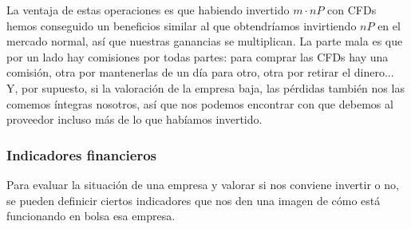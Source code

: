 \documentclass[nochap,palatino,shortheader]{apuntes}
\begin{document}
La ventaja de estas operaciones es que habiendo invertido $m·nP$ con CFDs hemos conseguido un beneficios similar al que obtendríamos invirtiendo $nP$ en el mercado normal, así que nuestras ganancias se multiplican. La parte mala es que por un lado hay comisiones por todas partes: para comprar las CFDs hay una comisión, otra por mantenerlas de un día para otro, otra por retirar el dinero... Y, por supuesto, si la valoración de la empresa baja, las pérdidas también nos las comemos íntegras nosotros, así que nos podemos encontrar con que debemos al proveedor incluso más de lo que habíamos invertido.

\subsubsection{Indicadores financieros}
\label{sec:IndicadoresFinancieros}

Para evaluar la situación de una empresa y valorar si nos conviene invertir o no, se pueden definicir ciertos indicadores que nos den una imagen de cómo está funcionando en bolsa esa empresa.
\end{document}
